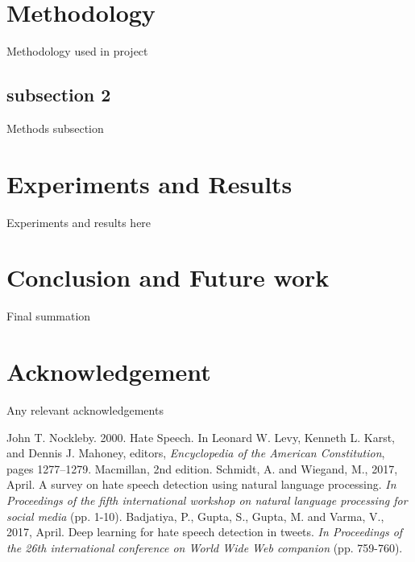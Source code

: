 \documentclass[conference]{IEEEtran}
\begin{document}
\section{Methodology}
Methodology used in project

\subsection{subsection 2}\label{AA}
Methods subsection

\section{Experiments and Results}
Experiments and results here

\section{Conclusion and Future work}
Final summation

\section*{Acknowledgement}

Any relevant acknowledgements

\begin{thebibliography}{00}
 John T. Nockleby. 2000. Hate Speech. In Leonard W.
Levy, Kenneth L. Karst, and Dennis J. Mahoney,
editors, \textit{Encyclopedia of the American Constitution},
pages 1277–1279. Macmillan, 2nd edition.
 Schmidt, A. and Wiegand, M., 2017, April. A survey on hate speech detection using natural language processing. \textit{In Proceedings of the fifth international workshop on natural language processing for social media} (pp. 1-10).
 Badjatiya, P., Gupta, S., Gupta, M. and Varma, V., 2017, April. Deep learning for hate speech detection in tweets. \textit{In Proceedings of the 26th international conference on World Wide Web companion} (pp. 759-760).
\end{thebibliography}
\vspace{12pt}
\end{document}
